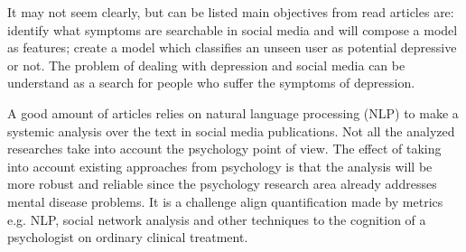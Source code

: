 \documentclass[11pt, notitlepage]{article} %
\begin{document}
\begin{center}
  \begin{table}[h!]
  \centering
    \caption{SLR Criterias for inclusion and exclusion.}
    \label{tab:rslCriterias}
  \end{table}
\end{center}
It may not seem clearly, but can be listed main objectives from read articles are: identify what symptoms are searchable in social media and will compose a model as features; create a model which classifies an unseen user as potential depressive or not. The problem of dealing with depression and social media can be understand as a search for people who suffer the symptoms of depression.
%

A good amount of articles relies on natural language processing (NLP) to make a systemic analysis over the text in social media publications. 
Not all the analyzed researches take into account the psychology point of view. The effect of taking into account existing approaches from psychology is that the analysis will be more robust and reliable since the psychology research area already addresses mental disease problems. It is a challenge align quantification made by metrics e.g. NLP, social network analysis and other techniques to the cognition of a psychologist on ordinary clinical treatment. 
\end{document}
